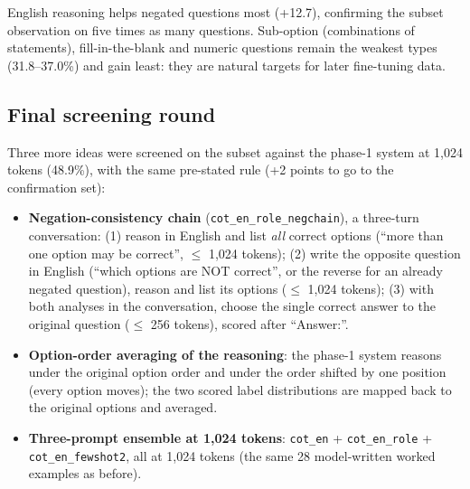 \documentclass[10pt,a4paper]{article}
\newcommand{\cond}[1]{\texttt{#1}}
\begin{document}
English reasoning helps negated questions most (+12.7), confirming the subset observation on five times as many
questions. Sub-option (combinations of statements), fill-in-the-blank and numeric questions remain the weakest types
(31.8--37.0\%) and gain least: they are natural targets for later fine-tuning data.

\subsection{Final screening round}\label{sec:final_round}
Three more ideas were screened on the subset against the phase-1 system at 1,024 tokens (48.9\%), with the same
pre-stated rule (+2 points to go to the confirmation set):
\begin{itemize}
\item \textbf{Negation-consistency chain} (\cond{cot\_en\_role\_negchain}), a three-turn conversation: (1) reason in
English and list \emph{all} correct options (``more than one option may be correct'', $\le$ 1,024 tokens);
(2) write the opposite question in English (``which options are NOT correct'', or the reverse for an already negated
question), reason and list its options ($\le$ 1,024 tokens); (3) with both analyses in the conversation, choose the
single correct answer to the original question ($\le$ 256 tokens), scored after ``Answer:\textvisiblespace''.
\item \textbf{Option-order averaging of the reasoning}: the phase-1 system reasons under the original option order and
under the order shifted by one position (every option moves); the two scored label distributions are mapped back to
the original options and averaged.
\item \textbf{Three-prompt ensemble at 1,024 tokens}: \cond{cot\_en} + \cond{cot\_en\_role} + \cond{cot\_en\_fewshot2},
all at 1,024 tokens (the same 28 model-written worked examples as before).
\end{itemize}
\end{document}
